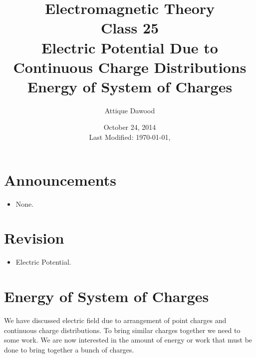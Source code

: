 \documentclass[12pt,a4paper]{article}
\title{Electromagnetic Theory\\Class 25\\Electric Potential Due to Continuous Charge Distributions\\Energy of System of Charges}
\author{Attique Dawood}
\date{October 24, 2014\\[0.2cm] Last Modified: \today, \currenttime}
\begin{document}
\maketitle
\section{Announcements}
\begin{itemize}
\item None.
\end{itemize}
\section{Revision}
\begin{itemize}
\item Electric Potential.
\end{itemize}
\section{Energy of System of Charges}
We have discussed electric field due to arrangement of point charges and continuous charge distributions. To bring similar charges together we need to some work. We are now interested in the amount of energy or work that must be done to bring together a bunch of charges.
\end{document}
